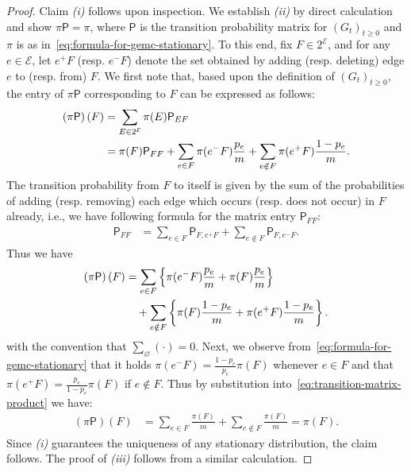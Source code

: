 \documentclass[11pt,a4paper]{article}
\begin{document}
\begin{proof}
    Claim \textit{(i)} follows upon inspection. We establish \textit{(ii)} by direct calculation and show $\pi \mathsf{P} = \pi$, where $\mathsf{P}$ is the transition probability matrix for $(G_t)_{t\geq 0}$ and $\pi$ is as in~\cref{eq:formula-for-gemc-stationary}. To this end, fix $F\in 2^\mathcal{E}$, and for any $e\in {\mathcal{E}}$, let ${e^+}F$ (resp. ${e^-}F$) denote the set obtained by adding (resp. deleting) edge $e$ to (resp. from) $F$. We first note that, based upon the definition of $(G_t)_{t\geq 0}$, the entry of $\pi\mathsf{P}$ corresponding to $F$ can be expressed as follows:
        \begin{align*}
            \left(\pi \mathsf{P}\right)(F) &= \sum_{E\in 2^\mathcal{E}} \pi(E)\mathsf{P}_{EF}\notag\\
            &= \pi(F)\mathsf{P}_{FF} + \sum_{e\in F} \pi{({e^-}F)}\frac{p_e}{{m}}  + \sum_{e\notin F} \pi{({e^+}F)}\frac{1-p_e}{{m}}.
        \end{align*}
    The transition probability from $F$ to itself is given by the sum of the probabilities of adding (resp. removing) each edge which occurs (resp. does not occur) in $F$ already, i.e., we have following formula for the matrix entry $\mathsf{P}_{FF}$:
        \begin{align*}
            \mathsf{P}_{FF} &= \sum_{e\in F} \mathsf{P}_{F, {e^+}F} + \sum_{e\notin F} \mathsf{P}_{F, {e^-}F}.
        \end{align*}
    Thus we have
        \begin{align}\label{eq:transition-matrix-product}
            \left(\pi \mathsf{P}\right)(F)&= \sum_{e\in F} \left\{\pi{({e^-}F)}\frac{p_e}{{m}} + \pi{(F)}\frac{p_e}{{m}}\right\}\notag\\
            &\quad+\sum_{e\notin F} \left\{\pi{(F)}\frac{1-p_e}{{m}} + \pi{({e^+}F)}\frac{1-p_e}{{m}}\right\}.
        \end{align}
    with the convention that $\sum_{\varnothing}(\cdot) = 0$. Next, we observe from~\cref{eq:formula-for-gemc-stationary} that it holds $\pi(e^- F) = \frac{1 - p_e}{p_e} \pi(F)$ whenever $e\in F$ and that $\pi(e^+ F) = \frac{p_e}{1-p_e} \pi(F)$ if $e\notin F$. Thus by substitution into~\cref{eq:transition-matrix-product} we have:
        \begin{align*}
            \left(\pi \mathsf{P}\right)(F)&= \sum_{e\in F} \frac{\pi{(F)}}{{m}} +\sum_{e\notin F}  \frac{\pi{(F)}}{{m}} =\pi(F).
        \end{align*}
    Since \textit{(i)} guarantees the uniqueness of any stationary distribution, the claim follows. The proof of \textit{(iii)} follows from a similar calculation. 
\end{proof}
\end{document}
